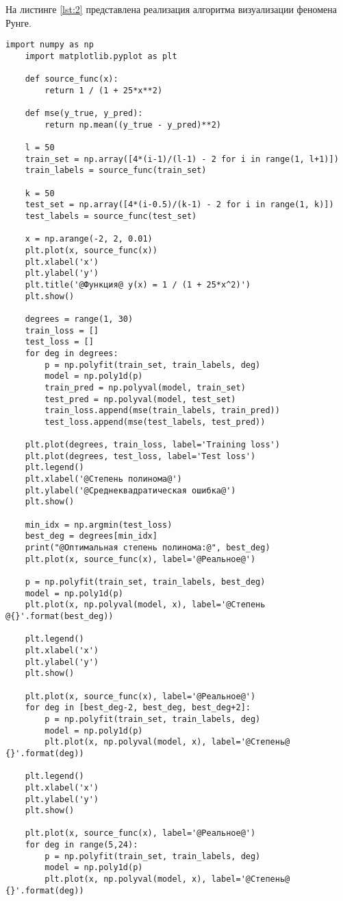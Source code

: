 На листинге \ref{lst:2} представлена реализация алгоритма визуализации феномена Рунге.

\begin{lstlisting}[label=lst:2,caption=Визуализация феномена Рунге]
	import numpy as np
	import matplotlib.pyplot as plt
	
	def source_func(x):
		return 1 / (1 + 25*x**2)
	
	def mse(y_true, y_pred):
		return np.mean((y_true - y_pred)**2)
	
	l = 50
	train_set = np.array([4*(i-1)/(l-1) - 2 for i in range(1, l+1)])
	train_labels = source_func(train_set)
	
	k = 50
	test_set = np.array([4*(i-0.5)/(k-1) - 2 for i in range(1, k)])
	test_labels = source_func(test_set)
	
	x = np.arange(-2, 2, 0.01)
	plt.plot(x, source_func(x))
	plt.xlabel('x')
	plt.ylabel('y')
	plt.title('@Функция@ y(x) = 1 / (1 + 25*x^2)')
	plt.show()
	
	degrees = range(1, 30)
	train_loss = []
	test_loss = []
	for deg in degrees:
		p = np.polyfit(train_set, train_labels, deg)
		model = np.poly1d(p)
		train_pred = np.polyval(model, train_set)
		test_pred = np.polyval(model, test_set)
		train_loss.append(mse(train_labels, train_pred))
		test_loss.append(mse(test_labels, test_pred))
	
	plt.plot(degrees, train_loss, label='Training loss')
	plt.plot(degrees, test_loss, label='Test loss')
	plt.legend()
	plt.xlabel('@Степень полинома@')
	plt.ylabel('@Среднеквадратическая ошибка@')
	plt.show()
	
	min_idx = np.argmin(test_loss)
	best_deg = degrees[min_idx]
	print("@Оптимальная степень полинома:@", best_deg)
	plt.plot(x, source_func(x), label='@Реальное@')
	
	p = np.polyfit(train_set, train_labels, best_deg)
	model = np.poly1d(p)
	plt.plot(x, np.polyval(model, x), label='@Степень @{}'.format(best_deg))
	
	plt.legend()
	plt.xlabel('x')
	plt.ylabel('y')
	plt.show()
	
	plt.plot(x, source_func(x), label='@Реальное@')
	for deg in [best_deg-2, best_deg, best_deg+2]:
		p = np.polyfit(train_set, train_labels, deg)
		model = np.poly1d(p)
		plt.plot(x, np.polyval(model, x), label='@Степень@ {}'.format(deg))
	
	plt.legend()
	plt.xlabel('x')
	plt.ylabel('y')
	plt.show()
	
	plt.plot(x, source_func(x), label='@Реальное@')
	for deg in range(5,24):
		p = np.polyfit(train_set, train_labels, deg)
		model = np.poly1d(p)
		plt.plot(x, np.polyval(model, x), label='@Степень@ {}'.format(deg))
	

\end{lstlisting}
